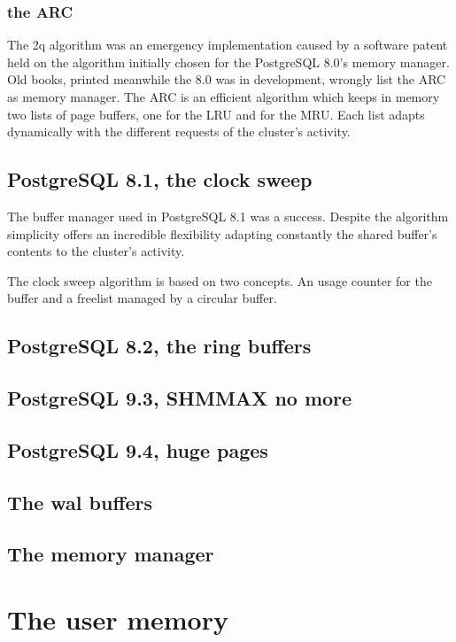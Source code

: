 \subsubsection{the ARC}
The 2q algorithm was an emergency implementation caused by a software patent held on the algorithm initially 
chosen for the PostgreSQL 8.0's memory manager. Old books, printed meanwhile the 8.0 was in development, 
wrongly list the ARC as memory manager. The ARC is an efficient algorithm which keeps in memory two 
lists of page buffers, one for the LRU and for the MRU. Each list adapts dynamically with the different requests 
of the cluster's activity. 

\subsection{PostgreSQL 8.1, the clock sweep}
The buffer manager used in PostgreSQL 8.1 was a success. Despite the algorithm simplicity offers an incredible 
flexibility adapting constantly the shared buffer's contents to the cluster's activity.\newline

The clock sweep algorithm is based on two concepts. An usage counter for the buffer and a freelist managed by a 
circular buffer. 


\subsection{PostgreSQL 8.2, the ring buffers}

\subsection{PostgreSQL 9.3, SHMMAX no more}

\subsection{PostgreSQL 9.4, huge pages}


\subsection{The wal buffers}

\subsection{The memory manager}
\section{The user memory}
